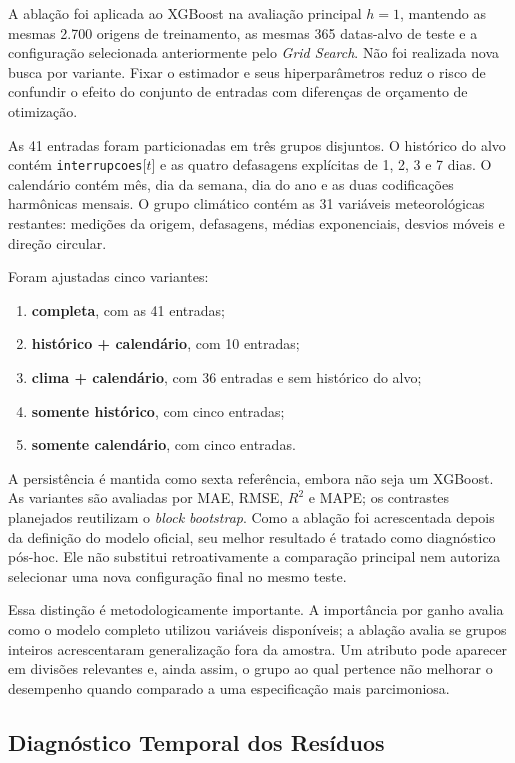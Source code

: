A ablação foi aplicada ao XGBoost na avaliação principal $h=1$, mantendo as mesmas 2.700 origens de treinamento, as mesmas 365 datas-alvo de teste e a configuração selecionada anteriormente pelo \textit{Grid Search}. Não foi realizada nova busca por variante. Fixar o estimador e seus hiperparâmetros reduz o risco de confundir o efeito do conjunto de entradas com diferenças de orçamento de otimização.

As 41 entradas foram particionadas em três grupos disjuntos. O histórico do alvo contém \texttt{interrupcoes}[$t$] e as quatro defasagens explícitas de 1, 2, 3 e 7 dias. O calendário contém mês, dia da semana, dia do ano e as duas codificações harmônicas mensais. O grupo climático contém as 31 variáveis meteorológicas restantes: medições da origem, defasagens, médias exponenciais, desvios móveis e direção circular.

Foram ajustadas cinco variantes:
\begin{enumerate}
    \item \textbf{completa}, com as 41 entradas;
    \item \textbf{histórico + calendário}, com 10 entradas;
    \item \textbf{clima + calendário}, com 36 entradas e sem histórico do alvo;
    \item \textbf{somente histórico}, com cinco entradas;
    \item \textbf{somente calendário}, com cinco entradas.
\end{enumerate}
A persistência é mantida como sexta referência, embora não seja um XGBoost. As variantes são avaliadas por MAE, RMSE, $R^2$ e MAPE; os contrastes planejados reutilizam o \textit{block bootstrap}. Como a ablação foi acrescentada depois da definição do modelo oficial, seu melhor resultado é tratado como diagnóstico pós-hoc. Ele não substitui retroativamente a comparação principal nem autoriza selecionar uma nova configuração final no mesmo teste.

Essa distinção é metodologicamente importante. A importância por ganho avalia como o modelo completo utilizou variáveis disponíveis; a ablação avalia se grupos inteiros acrescentaram generalização fora da amostra. Um atributo pode aparecer em divisões relevantes e, ainda assim, o grupo ao qual pertence não melhorar o desempenho quando comparado a uma especificação mais parcimoniosa.

\subsection{Diagnóstico Temporal dos Resíduos}\label{sec:metodo_residuos_temporais}

